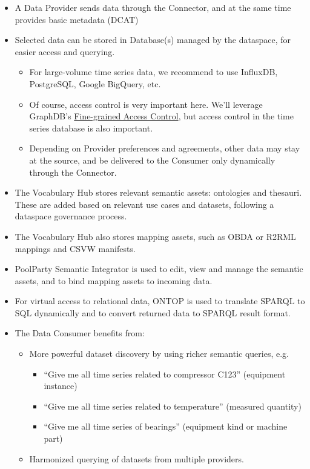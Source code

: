 \documentclass[
  super,
  preprint,
  3p]{elsarticle}
\providecommand{\tightlist}{%
  \setlength{\itemsep}{0pt}\setlength{\parskip}{0pt}}\usepackage{longtable,booktabs,array}
\begin{document}
\begin{itemize}
\tightlist
\item
  A Data Provider sends data through the Connector, and at the same time
  provides basic metadata (DCAT)
\item
  Selected data can be stored in Database(s) managed by the dataspace,
  for easier access and querying.

  \begin{itemize}
  \tightlist
  \item
    For large-volume time series data, we recommend to use InfluxDB,
    PostgreSQL, Google BigQuery, etc.
  \item
    Of course, access control is very important here. We'll leverage
    GraphDB's
    \href{https://graphdb.ontotext.com/documentation/10.6/fine-grained-access-control.html}{Fine-grained
    Access Control}, but access control in the time series database is
    also important.
  \item
    Depending on Provider preferences and agreements, other data may
    stay at the source, and be delivered to the Consumer only
    dynamically through the Connector.
  \end{itemize}
\item
  The Vocabulary Hub stores relevant semantic assets: ontologies and
  thesauri. These are added based on relevant use cases and datasets,
  following a dataspace governance process.
\item
  The Vocabulary Hub also stores mapping assets, such as OBDA or R2RML
  mappings and CSVW manifests.
\item
  PoolParty Semantic Integrator is used to edit, view and manage the
  semantic assets, and to bind mapping assets to incoming data.
\item
  For virtual access to relational data, ONTOP is used to translate
  SPARQL to SQL dynamically and to convert returned data to SPARQL
  result format.
\item
  The Data Consumer benefits from:

  \begin{itemize}
  \tightlist
  \item
    More powerful dataset discovery by using richer semantic queries,
    e.g.

    \begin{itemize}
    \tightlist
    \item
      ``Give me all time series related to compressor C123'' (equipment
      instance)
    \item
      ``Give me all time series related to temperature'' (measured
      quantity)
    \item
      ``Give me all time series of bearings'' (equipment kind or machine
      part)
    \end{itemize}
  \item
    Harmonized querying of datasets from multiple providers.
  \end{itemize}
\end{itemize}
\end{document}
